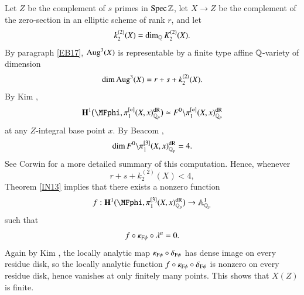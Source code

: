 Let $Z$ be the complement of $s$ primes in $\operatorname{Spec} \mathbb{Z}$, let $X \to Z$ be the complement of the zero-section in an elliptic scheme of rank $r$, and let 
\[
k^{(2)}_2(X) = \dim_{\mathbb{Q}} K^{(2)}_2(X).
\]
By paragraph \ref{EB17}, $\operatorname{Aug}^3(X)$ is representable by a finite type affine $\mathbb{Q}$-variety of dimension
\[
\dim \operatorname{Aug}^3(X) = r + s + k^{(2)}_2(X). 
\]
By Kim \cite{kimii}, 
\[
\mathbf{H}^1\big(
\MFphi, \pi_1^{[n]}(X,x)^\dR_\Qp
\big)
\simeq F^0 \backslash \pi_1^{[n]}(X,x)^\dR_\Qp
\]
at any $Z$-integral base point $x$. By Beacom \cite{beacom2020computation}, 
\[
\dim F^0 \backslash \pi_1^{[3]}(X,x)^{\rm {dR}}_{\mathbb{Q}_p}
=4.
\]
See Corwin \cite{CorwinEll} for a more detailed summary of this computation. Hence, whenever
\[
r + s + k^{(2)}_2(X) < 4,
\]
Theorem \ref{IN13} implies that there exists a nonzero function 
\[
f: \mathbf{H}^1 \big( \MFphi, \pi_1^{[3]}(X,x)^\dR_\Qp \big)
\to 
\AA^1_\Qp
\]
such that
\[
f \circ \kappa_{\mathrm{F}\phi} \circ \lambda^a = 0.
\]
Again by Kim \cite{kimii}, the locally analytic map $ \kappa_{\mathrm{F}\phi} \circ \delta_{\mathrm{F}\phi}$ has dense image on every residue disk, so the locally analytic function $f \circ \kappa_{\mathrm{F}\phi} \circ \delta_{\mathrm{F}\phi}$ is nonzero on every residue disk, hence vanishes at only finitely many points. This shows that $X(Z)$ is finite. 

\printbibliography











